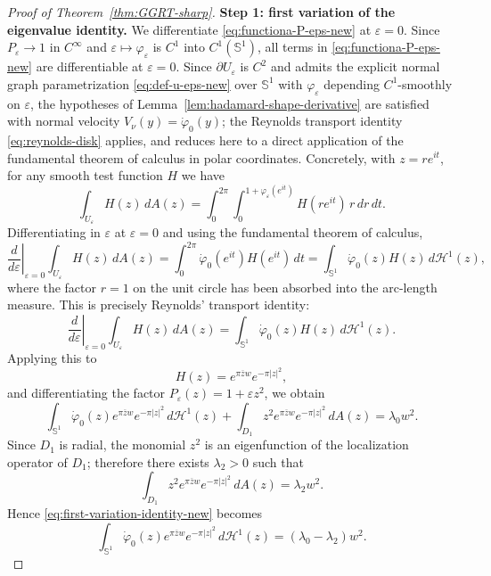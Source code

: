 \documentclass[a4paper,11pt,reqno]{amsart}
\numberwithin{equation}{section}
\theoremstyle{plain} %
\theoremstyle{definition} %
\theoremstyle{remark}
\begin{document}
\begin{proof}[Proof of Theorem~\ref{thm:GGRT-sharp}]
\medskip
\noindent
{\bf Step 1: first variation of the eigenvalue identity.} We differentiate \eqref{eq:functiona-P-eps-new} at $\varepsilon=0$.
Since \(P_\varepsilon\to 1\) in \(C^\infty\) and
\(\varepsilon\mapsto \varphi_\varepsilon\) is \(C^1\) into \(C^1(\mathbb S^1)\),
all terms in \eqref{eq:functiona-P-eps-new} are differentiable at
\(\varepsilon=0\). Since $\partial U_\varepsilon$ is $C^2$ and admits the
explicit normal graph parametrization \eqref{eq:def-u-eps-new} over
$\mathbb S^1$ with $\varphi_\varepsilon$ depending $C^1$-smoothly on
$\varepsilon$, the hypotheses of
Lemma~\ref{lem:hadamard-shape-derivative} are satisfied with normal velocity
\(V_\nu(y)=\dot\varphi_0(y)\); the Reynolds transport identity \eqref{eq:reynolds-disk}
applies, and reduces here to a direct application of the fundamental theorem
of calculus in polar coordinates. Concretely, with
\(z=re^{it}\), for any smooth test function \(H\) we have
\[
\int_{U_\varepsilon} H(z)\,dA(z)
=
\int_0^{2\pi}\int_0^{1+\varphi_\varepsilon(e^{it})}
H(re^{it})\,r\,dr\,dt.
\]
Differentiating in \(\varepsilon\) at \(\varepsilon=0\) and using the
fundamental theorem of calculus,
\[
\left.\frac{d}{d\varepsilon}\right|_{\varepsilon=0}
\int_{U_\varepsilon} H(z)\,dA(z)
=
\int_0^{2\pi}\dot\varphi_0(e^{it})H(e^{it})\,dt
=
\int_{\mathbb S^1}\dot\varphi_0(z)H(z)\,d\mathcal H^1(z),
\]
where the factor \(r=1\) on the unit circle has been absorbed into the
arc-length measure. This is precisely Reynolds' transport identity:
\[
\left.\frac{d}{d\varepsilon}\right|_{\varepsilon=0}
\int_{U_\varepsilon} H(z)\,dA(z)
=
\int_{\mathbb S^1} \dot\varphi_0(z)H(z)\,d\mathcal H^1(z).
\]
Applying this to
\[
H(z)=e^{\pi \overline zw}e^{-\pi|z|^2},
\]
and differentiating the factor $P_\varepsilon(z)=1+\varepsilon z^2$, we obtain
\begin{equation}\label{eq:first-variation-identity-new}
\int_{\mathbb S^1}
\dot\varphi_0(z)e^{\pi \overline zw}e^{-\pi|z|^2}\,d\mathcal H^1(z)
+
\int_{D_1} z^2 e^{\pi \overline zw}e^{-\pi|z|^2}\,dA(z)
=
\lambda_0 w^2.
\end{equation}
Since $D_1$ is radial, the monomial $z^2$ is an eigenfunction of the
localization operator of $D_1$; therefore there exists $\lambda_2>0$ such that
\[
\int_{D_1} z^2 e^{\pi \overline zw}e^{-\pi|z|^2}\,dA(z)=\lambda_2 w^2.
\]
Hence \eqref{eq:first-variation-identity-new} becomes
\begin{equation}\label{eq:boundary-identity-new}
\int_{\mathbb S^1}
\dot\varphi_0(z)e^{\pi \overline zw}e^{-\pi|z|^2}\,d\mathcal H^1(z)
=
(\lambda_0-\lambda_2)w^2.
\end{equation}

\end{proof}
\end{document}
